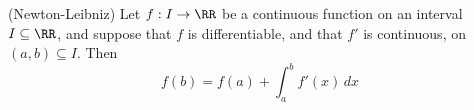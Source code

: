 

\begin{theorem}
(Newton-Leibniz) Let $f: I\to \RR $ be a continuous function on 
an interval $I\subseteq \RR$, and suppose that $f$ is differentiable, 
and that $f'$ is continuous, on $(a,b)\subseteq I$. Then
$$
f(b) = f(a) + \int_a^b f'(x)\,dx
$$
\end{theorem}

